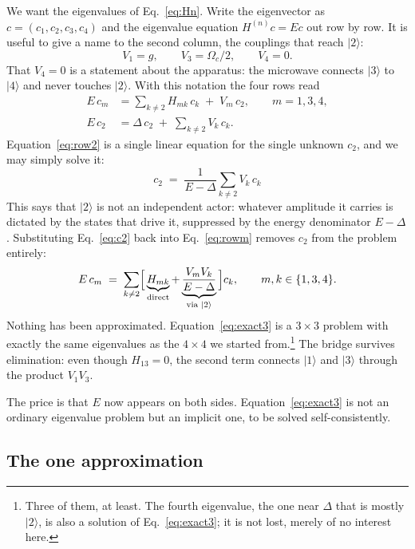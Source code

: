 \documentclass[11pt,a4paper]{article}
\newcommand{\ket}[1]{\lvert #1 \rangle}
\newcommand{\Om}{\Omega}
\begin{document}
We want the eigenvalues of Eq.~\eqref{eq:Hn}. Write the eigenvector as
$c=(c_1,c_2,c_3,c_4)$ and the eigenvalue equation $H^{(n)}c=Ec$ out row by row. It is useful to
give a name to the second column, the couplings that reach $\ket{2}$:
\begin{equation}
  V_1 = g, \qquad V_3 = \Om_c/2, \qquad V_4 = 0 .
  \label{eq:Vm}
\end{equation}
That $V_4=0$ is a statement about the apparatus: the microwave connects $\ket{3}$ to $\ket{4}$
and never touches $\ket{2}$. With this notation the four rows read
\begin{align}
  E\,c_m &= \sum_{k\neq2} H_{mk}\,c_k \;+\; V_m\,c_2 , \qquad m=1,3,4, \label{eq:rowm}\\
  E\,c_2 &= \Delta\,c_2 \;+\; \sum_{k\neq2} V_k\,c_k . \label{eq:row2}
\end{align}
Equation~\eqref{eq:row2} is a single linear equation for the single unknown $c_2$, and we may
simply solve it:
\begin{equation}
  \boxed{\ c_2 \;=\; \frac{1}{E-\Delta}\sum_{k\neq2} V_k\,c_k\ }
  \label{eq:c2}
\end{equation}
This says that $\ket{2}$ is not an independent actor: whatever amplitude it carries is dictated
by the states that drive it, suppressed by the energy denominator $E-\Delta$. Substituting
Eq.~\eqref{eq:c2} back into Eq.~\eqref{eq:rowm} removes $c_2$ from the problem entirely:
\begin{equation}
  E\,c_m \;=\; \sum_{k\neq2}
    \Bigl[\,\underbrace{H_{mk}}_{\text{direct}}
    + \underbrace{\frac{V_m V_k}{E-\Delta}}_{\text{via }\ket{2}}\,\Bigr] c_k ,
  \qquad m,k\in\{1,3,4\}.
  \label{eq:exact3}
\end{equation}
Nothing has been approximated. Equation~\eqref{eq:exact3} is a $3\times3$ problem with exactly
the same eigenvalues as the $4\times4$ we started from.\footnote{Three of them, at least. The
fourth eigenvalue, the one near $\Delta$ that is mostly $\ket{2}$, is also a solution of
Eq.~\eqref{eq:exact3}; it is not lost, merely of no interest here.} The bridge survives
elimination: even though $H_{13}=0$, the second term connects $\ket{1}$ and $\ket{3}$ through
the product $V_1V_3$.

The price is that $E$ now appears on both sides. Equation~\eqref{eq:exact3} is not an ordinary
eigenvalue problem but an implicit one, to be solved self-consistently.

\subsection{The one approximation}
\end{document}
